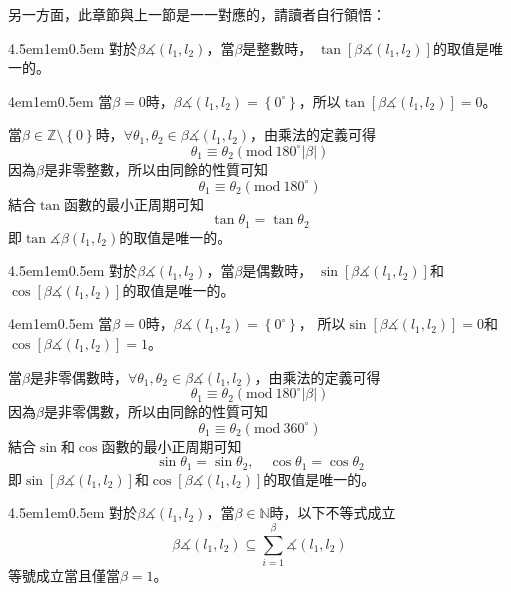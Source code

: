 \documentclass[12pt]{article}
\begin{document}
另一方面，此章節與上一節是一一對應的，請讀者自行領悟：
\begin{mybox}[允許1]{4.5em}{1em}{0.5em}
    對於$\beta\measuredangle{\left(l_1,l_2\right)}$，當$\beta$是整數時，
    $\tan{\left[\beta\measuredangle{\left(l_1,l_2\right)}\right]}$的取值是唯一的。
\end{mybox}
\begin{mybox}[證明]{4em}{1em}{0.5em}
    當$\beta=0$時，$\beta\measuredangle{\left(l_1,l_2\right)}=\left\{0^{\circ}\right\}$，所以$\tan{\left[\beta\measuredangle{\left(l_1,l_2\right)}\right]}=0$。

    當$\beta\in\mathbb{Z}\setminus\left\{0\right\}$時，$\forall \theta_1,\theta_2\in\beta\measuredangle{\left(l_1,l_2\right)}$，由乘法的定義可得
    $$
        \theta_1\equiv\theta_2\left(\text{mod}\ {180^{\circ}|\beta|}\right)
    $$
    因為$\beta$是非零整數，所以由同餘的性質可知
    $$
        \theta_1\equiv\theta_2\left(\text{mod}\ {180^{\circ}}\right)
    $$
    結合$\tan$函數的最小正周期可知
    $$
        \tan{\theta_1}=\tan{\theta_2}
    $$
    即$\tan{\measuredangle{\beta\left(l_1,l_2\right)}}$的取值是唯一的。
\end{mybox}
\begin{mybox}[允許2]{4.5em}{1em}{0.5em}
    對於$\beta\measuredangle{\left(l_1,l_2\right)}$，當$\beta$是偶數時，
    $\sin{\left[\beta\measuredangle{\left(l_1,l_2\right)}\right]}$和$\cos{\left[\beta\measuredangle{\left(l_1,l_2\right)}\right]}$的取值是唯一的。
\end{mybox}
\begin{mybox}[證明]{4em}{1em}{0.5em}
    當$\beta=0$時，$\beta\measuredangle{\left(l_1,l_2\right)}=\left\{0^{\circ}\right\}$，
    所以$\sin{\left[\beta\measuredangle{\left(l_1,l_2\right)}\right]}=0$和$\cos{\left[\beta\measuredangle{\left(l_1,l_2\right)}\right]}=1$。

    當$\beta$是非零偶數時，$\forall \theta_1,\theta_2\in\beta\measuredangle{\left(l_1,l_2\right)}$，由乘法的定義可得
    $$
        \theta_1\equiv\theta_2\left(\text{mod}\ {180^{\circ}|\beta|}\right)
    $$
    因為$\beta$是非零偶數，所以由同餘的性質可知
    $$
        \theta_1\equiv\theta_2\left(\text{mod}\ {360^{\circ}}\right)
    $$
    結合$\sin{}$和$\cos{}$函數的最小正周期可知
    $$
        \sin{\theta_1}=\sin{\theta_2},\quad \cos{\theta_1}=\cos{\theta_2}
    $$
    即$\sin{\left[\beta\measuredangle{\left(l_1,l_2\right)}\right]}$和$\cos{\left[\beta\measuredangle{\left(l_1,l_2\right)}\right]}$的取值是唯一的。
\end{mybox}
\begin{mybox}[允許3]{4.5em}{1em}{0.5em}
    對於$\beta\measuredangle{\left(l_1,l_2\right)}$，當$\beta\in\mathbb{N}$時，以下不等式成立
    $$
        \beta\measuredangle{\left(l_1,l_2\right)}\subseteq\sum\limits_{i=1}^{\beta}{\measuredangle{\left(l_1,l_2\right)}}
    $$
    等號成立當且僅當$\beta=1$。
\end{mybox}
\end{document}
